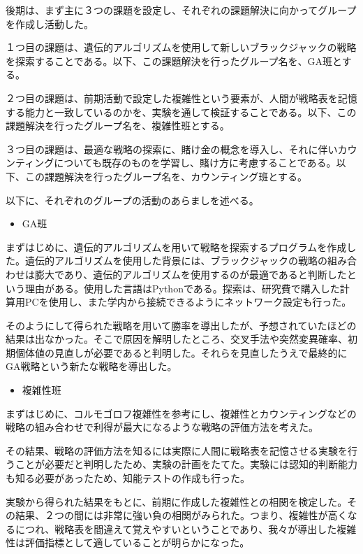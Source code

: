 後期は、まず主に３つの課題を設定し、それぞれの課題解決に向かってグループを作成し活動した。

１つ目の課題は、遺伝的アルゴリズムを使用して新しいブラックジャックの戦略を探索することである。以下、この課題解決を行ったグループ名を、GA班とする。

２つ目の課題は、前期活動で設定した複雑性という要素が、人間が戦略表を記憶する能力と一致しているのかを、実験を通して検証することである。以下、この課題解決を行ったグループ名を、複雑性班とする。

３つ目の課題は、最適な戦略の探索に、賭け金の概念を導入し、それに伴いカウンティングについても既存のものを学習し、賭け方に考慮することである。以下、この課題解決を行ったグループ名を、カウンティング班とする。

以下に、それぞれのグループの活動のあらましを述べる。

\begin{itemize}
\item GA班
\end{itemize}

まずはじめに、遺伝的アルゴリズムを用いて戦略を探索するプログラムを作成した。遺伝的アルゴリズムを使用した背景には、ブラックジャックの戦略の組み合わせは膨大であり、遺伝的アルゴリズムを使用するのが最適であると判断したという理由がある。使用した言語はPythonである。探索は、研究費で購入した計算用PCを使用し、また学内から接続できるようにネットワーク設定も行った。

そのようにして得られた戦略を用いて勝率を導出したが、予想されていたほどの結果は出なかった。そこで原因を解明したところ、交叉手法や突然変異確率、初期個体値の見直しが必要であると判明した。それらを見直したうえで最終的にGA戦略という新たな戦略を導出した。

\begin{itemize}
\item 複雑性班
\end{itemize}

まずはじめに、コルモゴロフ複雑性を参考にし、複雑性とカウンティングなどの戦略の組み合わせで利得が最大になるような戦略の評価方法を考えた。

その結果、戦略の評価方法を知るには実際に人間に戦略表を記憶させる実験を行うことが必要だと判明したため、実験の計画をたてた。実験には認知的判断能力も知る必要があったため、知能テストの作成も行った。

実験から得られた結果をもとに、前期に作成した複雑性との相関を検定した。その結果、２つの間には非常に強い負の相関がみられた。つまり、複雑性が高くなるにつれ、戦略表を間違えて覚えやすいということであり、我々が導出した複雑性は評価指標として適していることが明らかになった。

